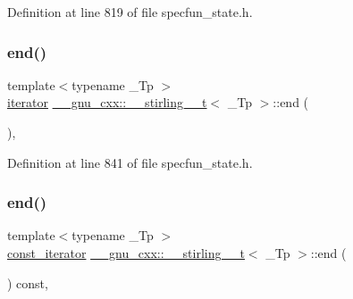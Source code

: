 Definition at line 819 of file specfun\+\_\+state.\+h.

\mbox{\label{struct____gnu__cxx_1_1____stirling__1__t_a2684a7da6d924ec5bb8b3ebfab00adad}} 
\subsubsection{\texorpdfstring{end()}{end()}\hspace{0.1cm}{\footnotesize\ttfamily [1/2]}}
{\footnotesize\ttfamily template$<$typename \+\_\+\+Tp $>$ \\
\hyperlink{struct____gnu__cxx_1_1____stirling__1__t_a4dad153706e77f66c38d2a620230ac35}{iterator} \hyperlink{struct____gnu__cxx_1_1____stirling__1__t}{\+\_\+\+\_\+gnu\+\_\+cxx\+::\+\_\+\+\_\+stirling\+\_\+\_\+t}$<$ \+\_\+\+Tp $>$\+::end (\begin{DoxyParamCaption}{ }\end{DoxyParamCaption})\hspace{0.3cm}{\ttfamily [inline]}, {\ttfamily [noexcept]}}



Definition at line 841 of file specfun\+\_\+state.\+h.

\mbox{\label{struct____gnu__cxx_1_1____stirling__1__t_a300ecff91bda7b2ff497e05174269ef9}} 
\subsubsection{\texorpdfstring{end()}{end()}\hspace{0.1cm}{\footnotesize\ttfamily [2/2]}}
{\footnotesize\ttfamily template$<$typename \+\_\+\+Tp $>$ \\
\hyperlink{struct____gnu__cxx_1_1____stirling__1__t_a2b4e459dac02038428602f6315b97941}{const\+\_\+iterator} \hyperlink{struct____gnu__cxx_1_1____stirling__1__t}{\+\_\+\+\_\+gnu\+\_\+cxx\+::\+\_\+\+\_\+stirling\+\_\+\_\+t}$<$ \+\_\+\+Tp $>$\+::end (\begin{DoxyParamCaption}{ }\end{DoxyParamCaption}) const\hspace{0.3cm}{\ttfamily [inline]}, {\ttfamily [noexcept]}}



